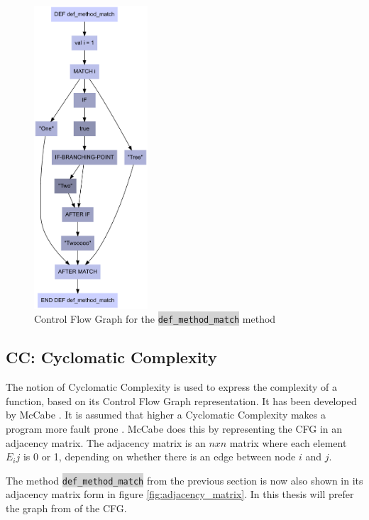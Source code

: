 \documentclass[onecolumn]{article}
\newcommand{\code}[1]{\colorbox{lightgray}{\texttt{#1}}}
\begin{document}
\begin{figure}[H]
  \centering
  \includegraphics[width = 120pt]{fig/def_method_match.pdf}
  \caption{Control Flow Graph for the \code{def\_method\_match} method}
  \label{fig:def_method_match}
\end{figure}


\subsection{CC: Cyclomatic Complexity} \label{general_cc_explanation}
The notion of Cyclomatic Complexity is used to express the complexity of a function, based on its Control Flow Graph representation. It has been developed by McCabe \cite{mccabe1976complexity}. It is assumed that higher a Cyclomatic Complexity makes a program more fault prone \cite{basili1996validation}.
McCabe does this by representing the CFG in an adjacency matrix. The adjacency matrix is an $n x n$ matrix where each element $E_ij$ is 0 or 1, depending on whether there is an edge between node $i$ and $j$.

The method \code{def\_method\_match} from the previous section is now also shown in its adjacency matrix form in figure \ref{fig:adjacency_matrix}. In this thesis will prefer the graph from of the CFG.
\end{document}
